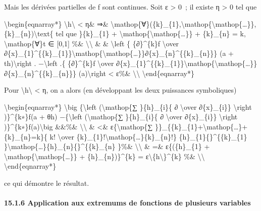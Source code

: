 Mais les dérivées partielles de f sont continues. Soit ε \textgreater{}
0~; il existe η \textgreater{} 0 tel que

\textbackslash{}begin\{eqnarray*\}
\textbackslash{}\textbar{}h\textbackslash{}\textbar{} \textless{} η\&
⇒\&
\textbackslash{}mathop\{∀\}(\{k\}\_\{1\},\textbackslash{}mathop\{\textbackslash{}mathop\{\ldots{}\}\},\{k\}\_\{n\})\textbackslash{}text\{
tel que \}\{k\}\_\{1\} +
\textbackslash{}mathop\{\textbackslash{}mathop\{\ldots{}\}\} +
\{k\}\_\{n\} = k, \textbackslash{}mathop\{∀\}t ∈ {[}0,1{]} \%\&
\textbackslash{}\textbackslash{} \& \& \textbackslash{}left \textbar{}\{
\{∂\}\^{}\{k\}f \textbackslash{}over
∂\{x\}\_\{1\}\^{}\{\{k\}\_\{1\}\}\textbackslash{}mathop\{\textbackslash{}mathop\{\ldots{}\}\}∂\{x\}\_\{n\}\^{}\{\{k\}\_\{n\}\}\}
(a + th)\textbackslash{}right . −\textbackslash{}left .\{
\{∂\}\^{}\{k\}f \textbackslash{}over
∂\{x\}\_\{1\}\^{}\{\{k\}\_\{1\}\}\textbackslash{}mathop\{\textbackslash{}mathop\{\ldots{}\}\}∂\{x\}\_\{n\}\^{}\{\{k\}\_\{n\}\}\}
(a)\textbackslash{}right \textbar{} \textless{} ε\%\&
\textbackslash{}\textbackslash{} \textbackslash{}end\{eqnarray*\}

Pour \textbackslash{}\textbar{}h\textbackslash{}\textbar{} \textless{}
η, on a alors (en développant les deux puissances symboliques)

\textbackslash{}begin\{eqnarray*\} \textbackslash{}big
\textbar{}\{\textbackslash{}left (\textbackslash{}mathop\{∑
\}\{h\}\_\{i\}\{ ∂ \textbackslash{}over ∂\{x\}\_\{i\}\}
\textbackslash{}right )\}\^{}\{k∗\}f(a + θh) −\{\textbackslash{}left
(\textbackslash{}mathop\{∑ \}\{h\}\_\{i\}\{ ∂ \textbackslash{}over
∂\{x\}\_\{i\}\} \textbackslash{}right
)\}\^{}\{k∗\}f(a)\textbackslash{}big \textbar{}\&\&\%\&
\textbackslash{}\textbackslash{} \& \textless{}\&
ε\{\textbackslash{}mathop\{∑
\}\}\_\{\{k\}\_\{1\}+\textbackslash{}mathop\{\ldots{}\}+\{k\}\_\{n\}=k\}\{
k! \textbackslash{}over
\{k\}\_\{1\}!\textbackslash{}mathop\{\ldots{}\}\{k\}\_\{n\}!\}
\textbar{}\{h\}\_\{1\}\{\textbar{}\}\^{}\{\{k\}\_\{1\}
\}\textbackslash{}mathop\{\ldots{}\}\textbar{}\{h\}\_\{n\}\{\textbar{}\}\^{}\{\{k\}\_\{n\}
\}\%\& \textbackslash{}\textbackslash{} \& =\&
ε\{(\textbar{}\{h\}\_\{1\}\textbar{} +
\textbackslash{}mathop\{\textbackslash{}mathop\{\ldots{}\}\} +
\textbar{}\{h\}\_\{n\}\textbar{})\}\^{}\{k\} =
ε\textbackslash{}\textbar{}\{h\textbackslash{}\textbar{}\}\^{}\{k\} \%\&
\textbackslash{}\textbackslash{} \textbackslash{}end\{eqnarray*\}

ce qui démontre le résultat.

\paragraph{15.1.6 Application aux extremums de fonctions de plusieurs
variables}

